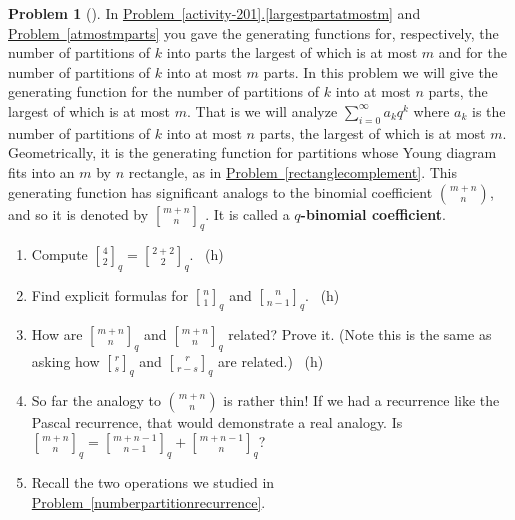 \documentclass[10pt,]{book}
\newcommand{\terminology}[1]{\textbf{#1}}
\theoremstyle{plain}
\theoremstyle{definition}
\newtheorem{activity}[project]{Problem}
\theoremstyle{definition}
\numberwithin{equation}{chapter}
\newcommand{\importantarrow}{\Rightarrow}
\newcommand{\qchoose}[2]{\genfrac{[}{]}{0pt}{}{#1}{#2}_q}
\begin{document}
\begin{activity}[]\marginsymbol[-1em]{\pdftooltip{$\importantarrow$}{especially interesting}} \label{qtorialformula}
\hypertarget{p-1186}{}%
In \hyperref[largestpartatmostm]{Problem~\ref{activity-201}.\ref{largestpartatmostm}} and \hyperref[atmostmparts]{Problem~\ref{atmostmparts}} you gave the generating functions for, respectively, the number of partitions of \(k\) into parts the largest of which is at most \(m\) and for the number of partitions of \(k\) into at most \(m\) parts. In this problem we will give the generating function for the number of partitions of \(k\) into at most \(n\) parts, the largest of which is at most \(m\). That is we will analyze \(\sum_{i=0}^\infty a_kq^k\) where \(a_k\) is the number of partitions of \(k\) into at most \(n\) parts, the largest of which is at most \(m\). Geometrically, it is the generating function for partitions whose Young diagram fits into an \(m\) by \(n\) rectangle, as in \hyperref[rectanglecomplement]{Problem~\ref{rectanglecomplement}}. This generating function has significant analogs to the binomial coefficient \(\binom{m+n}{n}\), and so it is denoted by \(\qchoose{m+n}{n}\). It is called a \terminology{\(q\)-binomial coefficient}.%
\begin{enumerate}[font=\bfseries,label=(\alph*),ref=\alph*]
\item\label{task-146} \marginsymbol[-2.5em]{} \hypertarget{p-1187}{}%
Compute \(\qchoose{4}{2}=\qchoose{2+2}{2}\).%
~{\tiny (h)}\item\label{task-147} \marginsymbol[-2.5em]{} \hypertarget{p-1190}{}%
Find explicit formulas for \(\qchoose{n}{1}\) and \(\qchoose{n}{n-1}\).%
~{\tiny (h)}\item\label{task-148} \marginsymbol[-2.5em]{} \hypertarget{p-1193}{}%
How are \(\qchoose{m+n}{n}\) and \(\qchoose{m+n}{n}\) related? Prove it. (Note this is the same as asking how \(\qchoose{r}{s}\) and \(\qchoose{r}{r-s}\) are related.)%
~{\tiny (h)}\item\label{task-149} \marginsymbol[-2.5em]{} \hypertarget{p-1196}{}%
So far the analogy to \(\binom{m+n}{n}\) is rather thin! If we had a recurrence like the Pascal recurrence, that would demonstrate a real analogy. Is \(\qchoose{m+n}{n}= \qchoose{m+n-1}{n-1}+\qchoose{m+n-1}{n}\)?%
\item\label{task-150} \marginsymbol[-2.5em]{} \hypertarget{p-1198}{}%
Recall the two operations we studied in \hyperref[numberpartitionrecurrence]{Problem~\ref{numberpartitionrecurrence}}.%

\end{enumerate}
\end{activity}
\end{document}
